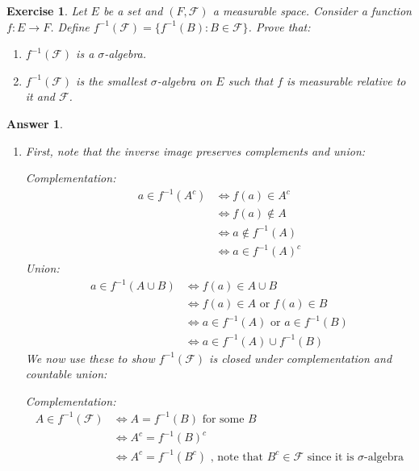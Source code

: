 \documentclass[12pt]{article}
\theoremstyle{colon}
\newtheorem{exercise}{Exercise}
\newtheorem*{answer}{Answer}
\begin{document}
\clearpage

\begin{exercise}
  Let $E$ be a set and $(F, \mathcal{F})$ a measurable space. Consider a function $f: E \rightarrow F$. Define $f^{-1}(\mathcal{F}) = \{ f^{-1}(B) : B \in \mathcal{F} \}$. Prove that:
  \begin{enumerate}[label=(\roman*)]
    \item $f^{-1}(\mathcal{F})$ is a $\sigma$-algebra.
    \item $f^{-1}(\mathcal{F})$ is the smallest $\sigma$-algebra on $E$ such that $f$ is measurable relative to it and $\mathcal{F}$.
  \end{enumerate}
\end{exercise}

\begin{answer}
  \leavevmode
  \begin{enumerate}[label=(\roman*)]
    \item First, note that the inverse image preserves complements and union:
      \par
      Complementation:
      \begin{align*}
        a \in f^{-1}(A^c) &\Longleftrightarrow f(a) \in A^c \\
        &\Longleftrightarrow f(a) \notin A \\
        &\Longleftrightarrow a \notin f^{-1}(A) \\
        &\Longleftrightarrow a \in f^{-1}(A)^c
      \end{align*}
      Union:
      \begin{align*}
        a \in f^{-1}(A \cup B) &\Longleftrightarrow f(a) \in A \cup B \\
        &\Longleftrightarrow f(a) \in A \text{ or } f(a) \in B \\
        &\Longleftrightarrow a \in f^{-1}(A) \text{ or } a \in f^{-1}(B) \\
        &\Longleftrightarrow a \in f^{-1}(A) \cup f^{-1}(B)
      \end{align*}
      We now use these to show $f^{-1}(\mathcal{F})$ is closed under complementation and countable union:
      \par
      Complementation:
      \begin{align*}
        A \in f^{-1}(\mathcal{F}) &\Longleftrightarrow A = f^{-1}(B) \text{ for some } B \\
        &\Longleftrightarrow A^c = f^{-1}(B)^c \\
        &\Longleftrightarrow A^c = f^{-1}(B^c) \text{ , note that } B^c \in \mathcal{F} \text{ since it is $\sigma$-algebra} \\

\end{align*}
\end{enumerate}
\end{answer}
\end{document}
